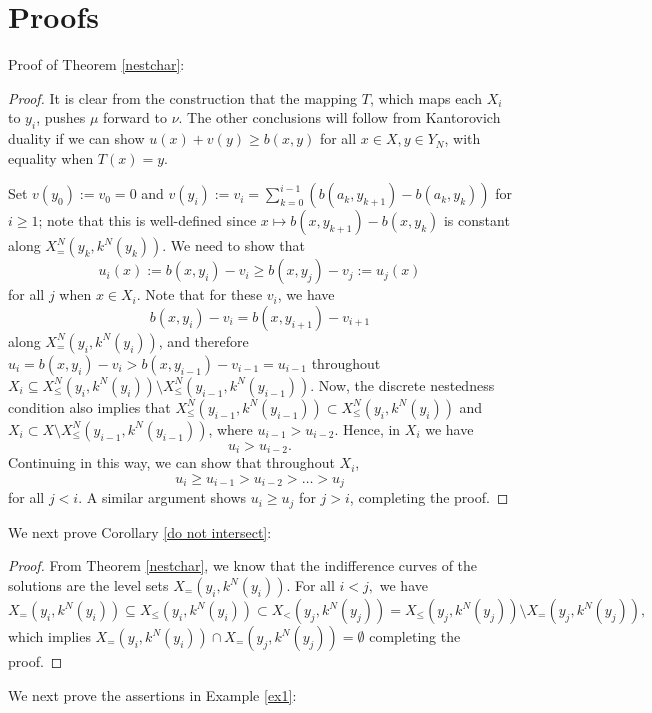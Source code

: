 \documentclass[12pt,reqno]{amsart}
\begin{document}
\section{Proofs}
Proof of Theorem \ref{nestchar}:
\begin{proof}
It is clear from the construction that the mapping $T$, which maps each $X_i$ to $y_i$, pushes $\mu$ forward to $\nu$. The other conclusions will follow from Kantorovich duality if we can show $u(x) + v(y) \geq b(x, y)$ for all $x \in X, y \in Y_N$, with equality when $T(x) = y$.

Set $v(y_0):=v_0 = 0$ and $v(y_i):=v_i = \sum_{k=0}^{i-1}(b(a_k, y_{k+1}) - b(a_k, y_k))$ for $i \geq 1$; note that this is well-defined since $x \mapsto b(x, y_{k+1}) - b(x, y_k)$ is constant along $X^N_{=}(y_k, k^N(y_k))$. We need to show that
\[
u_i(x) := b(x, y_i) - v_i \geq b(x, y_j) - v_j := u_j(x)
\]
for all $j$ when $x \in X_i$. Note that for these $v_i$, we have
\[
b(x, y_i) - v_i = b(x, y_{i+1}) - v_{i+1}
\]
along $X^N_{=}(y_i, k^N(y_i))$, and therefore $u_i = b(x, y_i) - v_i > b(x, y_{i-1}) - v_{i-1} = u_{i-1}$ throughout $X_i \subseteq X^N_{\leq}(y_i, k^N(y_i)) \setminus X^N_{\leq}(y_{i-1}, k^N(y_{i-1}))$. Now, the discrete nestedness condition also implies that $X^N_{\leq}(y_{i-1}, k^N(y_{i-1})) \subset X^N_{\leq}(y_i, k^N(y_i))$ and $X_i \subset X \setminus X^N_{\leq}(y_{i-1}, k^N(y_{i-1}))$, where $u_{i-1} > u_{i-2}$. Hence, in $X_i$ we have
\[
u_i > u_{i-2}.
\]
Continuing in this way, we can show that throughout $X_i$,
\[
u_i \geq u_{i-1} > u_{i-2} > \dots > u_j
\]
for all $j < i$. A similar argument shows $u_i \geq u_j$ for $j > i$, completing the proof.
\end{proof}
We next prove Corollary \ref{do not intersect}:
\begin{proof}
    From Theorem \ref{nestchar}, we know that the indifference curves of the solutions are the level sets $X_=(y_i,k^N(y_i)).$ For all $i<j,$ we have $X_=(y_i,k^N(y_i))\subseteq X_\le(y_i,k^N(y_i))\subset X_<(y_j,k^N(y_j))=X_\le(y_j,k^N(y_j))\setminus X_=(y_j,k^N(y_j)),$ which implies $X_=(y_i,k^N(y_i))\cap X_=(y_j,k^N(y_j))=\emptyset$ completing the proof.
\end{proof}
We next prove the assertions in Example \ref{ex1}:
\end{document}
